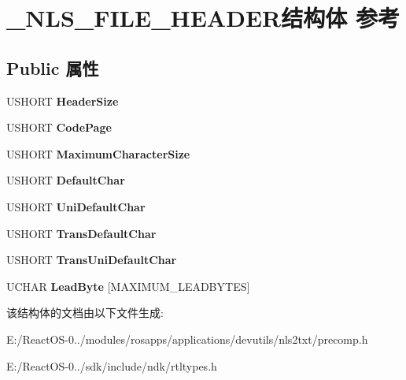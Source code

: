 \hypertarget{struct___n_l_s___f_i_l_e___h_e_a_d_e_r}{}\section{\+\_\+\+N\+L\+S\+\_\+\+F\+I\+L\+E\+\_\+\+H\+E\+A\+D\+E\+R结构体 参考}
\label{struct___n_l_s___f_i_l_e___h_e_a_d_e_r}
\subsection*{Public 属性}
\begin{DoxyCompactItemize}
\item 
\mbox{\label{struct___n_l_s___f_i_l_e___h_e_a_d_e_r_a96f8314f5d22737110516350db8ffe97}} 
U\+S\+H\+O\+RT {\bfseries Header\+Size}
\item 
\mbox{\label{struct___n_l_s___f_i_l_e___h_e_a_d_e_r_ab5f31a14b65843600d1124a2e9ab2964}} 
U\+S\+H\+O\+RT {\bfseries Code\+Page}
\item 
\mbox{\label{struct___n_l_s___f_i_l_e___h_e_a_d_e_r_a535fb33b05035431a6670eaeaa81ebbe}} 
U\+S\+H\+O\+RT {\bfseries Maximum\+Character\+Size}
\item 
\mbox{\label{struct___n_l_s___f_i_l_e___h_e_a_d_e_r_aec6c0c11389a8ae2c6fd558c535c86d1}} 
U\+S\+H\+O\+RT {\bfseries Default\+Char}
\item 
\mbox{\label{struct___n_l_s___f_i_l_e___h_e_a_d_e_r_af0d9999706064e09aab0af661208bd56}} 
U\+S\+H\+O\+RT {\bfseries Uni\+Default\+Char}
\item 
\mbox{\label{struct___n_l_s___f_i_l_e___h_e_a_d_e_r_a84f0a102fd752099a93bab2adeddbf82}} 
U\+S\+H\+O\+RT {\bfseries Trans\+Default\+Char}
\item 
\mbox{\label{struct___n_l_s___f_i_l_e___h_e_a_d_e_r_adb9d2182f41fae91740218884f038e74}} 
U\+S\+H\+O\+RT {\bfseries Trans\+Uni\+Default\+Char}
\item 
\mbox{\label{struct___n_l_s___f_i_l_e___h_e_a_d_e_r_a7eea6da9f473d0a42ff415bba338650a}} 
U\+C\+H\+AR {\bfseries Lead\+Byte} \mbox{[}M\+A\+X\+I\+M\+U\+M\+\_\+\+L\+E\+A\+D\+B\+Y\+T\+ES\mbox{]}
\end{DoxyCompactItemize}


该结构体的文档由以下文件生成\+:\begin{DoxyCompactItemize}
\item 
E\+:/\+React\+O\+S-\/0../modules/rosapps/applications/devutils/nls2txt/precomp.\+h\item 
E\+:/\+React\+O\+S-\/0../sdk/include/ndk/rtltypes.\+h\end{DoxyCompactItemize}
